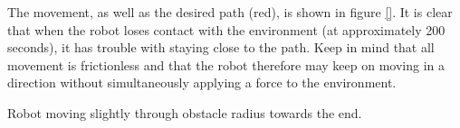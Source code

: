 The movement, as well as the desired path (red), is shown in figure \ref{}. It is clear that when the robot loses contact with the environment (at approximately 200 seconds), it has trouble with staying close to the path. Keep in mind that all movement is frictionless and that the robot therefore may keep on moving in a direction without simultaneously applying a force to the environment.

Robot moving slightly through obstacle radius towards the end.

\begin{figure}
    \centering
    
    \hfil
    

\end{figure}
